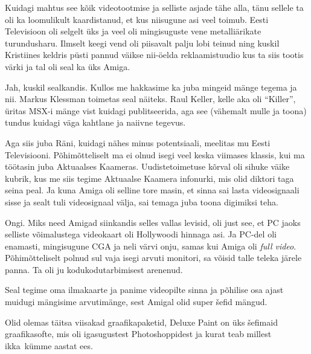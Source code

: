 Kuidagi mahtus see kõik videotootmise ja selliste asjade tähe alla, tänu sellele ta oli ka loomulikult kaardistanud, et kus niisugune asi veel toimub. Eesti Televisioon oli selgelt üks ja veel oli mingisuguste vene metalliärikate turundusharu. Ilmselt keegi vend oli piisavalt palju lobi teinud ning kuskil Kristiines  keldris püsti pannud väikse nii-öelda reklaamistuudio kus ta siis tootis värki ja tal oli seal ka üks Amiga. 


Jah, kuskil sealkandis. Kullos me hakkasime ka juba mingeid mänge tegema ja nii. Markus Klessman toimetas seal näiteks. Raul Keller, kelle aka oli \enquote{Killer}, üritas MSX-i mänge vist kuidagi publitseerida, aga see (vähemalt mulle ja toona) tundus kuidagi väga kahtlane ja naiivne tegevus.

Aga siis juba Räni, kuidagi nähes minus potentsiaali, meelitas mu Eesti Televisiooni. Põhimõtteliselt ma ei olnud isegi veel keska viimases klassis, kui ma töötasin juba Aktuaalses Kaameras. Uudistetoimetuse kõrval oli sihuke väike kubrik, kus me siis tegime Aktuaalse Kaamera infonurki, mis olid  diktori taga seina peal. Ja kuna Amiga oli selline tore masin, et  sinna sai lasta videosignaali sisse ja sealt tuli videosignaal välja, sai temaga juba toona digimiksi teha. 


Ongi. Miks need Amigad siinkandis selles vallas levisid, oli just see, et PC jaoks selliste võimalustega videokaart oli Hollywoodi hinnaga asi. Ja PC-del oli enamasti, mingisugune CGA ja neli värvi onju, samas kui Amiga oli \emph{full video}. Põhimõtteliselt polnud sul vaja isegi arvuti monitori, sa võisid talle teleka järele panna. Ta oli ju  kodukodutarbimisest arenenud. 

Seal tegime oma ilmakaarte ja panime videopilte sinna ja põhilise osa ajast muidugi mängisime arvutimänge, sest  Amigal olid super šefid mängud. 


Olid olemas täitsa viisakad graafikapaketid, Deluxe Paint on üks šefimaid graafikasofte, mis oli igasugustest Photoshoppidest ja kurat teab millest ikka kümme aastat ees. 

